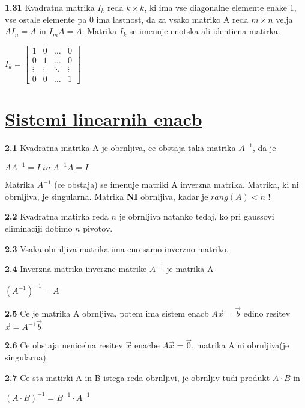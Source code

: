 \documentclass{article}
\begin{document}
\begin{multicols}{4}
	\textbf{1.31} Kvadratna matrika $I_{k}$ reda $k \times k$, ki ima vse diagonalne
	elemente enake 1, vse ostale elemente pa 0 ima lastnost, da za vsako matriko A
	reda $m \times n$ velja $AI_{n} = A$ in $I_{m}A = A$. Matrika $I_{k}$ se imenuje
	enotska ali identicna matirka.
	\begin{center}
		$I_{k}=
			\begin{bmatrix}
				1      & 0      & \hdots & 0      \\
				0      & 1      & \hdots & 0      \\
				\vdots & \vdots & \ddots & \vdots \\
				0      & 0      & \hdots & 1
			\end{bmatrix}
		$
	\end{center}

	\section{\underline{Sistemi linearnih enacb}}

	\textbf{2.1} Kvadratna matrika A je obrnljiva, ce obstaja taka matrika
	$A^{-1}$, da je
	\begin{center}
		$AA^{-1} = I\;
			in\;
			A^{-1}A = I
		$
	\end{center}
	Matrika $A^{-1}$ (ce obstaja) se imenuje matriki A inverzna matrika.
	Matrika, ki ni obrnljiva, je singularna. Matrika \textbf{NI} obrnljiva, kadar je
	$rang(A) < n$ !

	\textbf{2.2} Kvadratna matirka reda $n$ je obrnljiva natanko tedaj, ko pri
	gaussovi eliminaciji dobimo $n$ pivotov.

	\textbf{2.3} Vsaka obrnljiva matrika ima eno samo inverzno matriko.

	\textbf{2.4} Inverzna matrika inverzne matrike $A^{-1}$ je matrika A
	\begin{center}
		$(A^{-1})^{-1} = A$
	\end{center}

	\textbf{2.5} Ce je matrika A obrnljiva, potem ima sistem enacb
	$A\vec{x} = \vec{b}$ edino resitev $\vec{x} = A^{-1} \vec{b}$

	\textbf{2.6} Ce obstaja nenicelna resitev $\vec{x}$ enacbe $A\vec{x} = \vec{0}$,
	matrika A ni obrnljiva(je singularna).

	\textbf{2.7} Ce sta matirki A in B istega reda obrnljivi, je obrnljiv tudi
	produkt $A \cdot B$ in
	\begin{center}
		$(A \cdot B)^{-1} =
			B^{-1} \cdot A^{-1}
		$
	\end{center}


\end{multicols}
\end{document}
